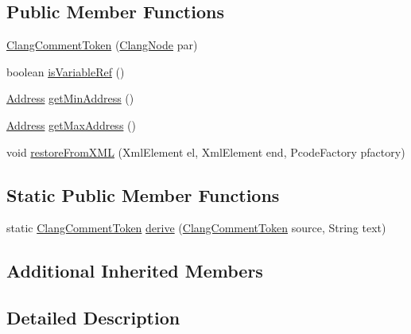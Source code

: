 \subsection*{Public Member Functions}
\begin{DoxyCompactItemize}
\item 
\mbox{\hyperlink{classghidra_1_1app_1_1decompiler_1_1_clang_comment_token_a1cb6ab510d9ce9249f82ac0c9279a7d6}{Clang\+Comment\+Token}} (\mbox{\hyperlink{interfaceghidra_1_1app_1_1decompiler_1_1_clang_node}{Clang\+Node}} par)
\item 
boolean \mbox{\hyperlink{classghidra_1_1app_1_1decompiler_1_1_clang_comment_token_accf25b09504782348ff3a62f3633c89b}{is\+Variable\+Ref}} ()
\item 
\mbox{\hyperlink{class_address}{Address}} \mbox{\hyperlink{classghidra_1_1app_1_1decompiler_1_1_clang_comment_token_a37ada2eb4a2e4a987ae098096459910a}{get\+Min\+Address}} ()
\item 
\mbox{\hyperlink{class_address}{Address}} \mbox{\hyperlink{classghidra_1_1app_1_1decompiler_1_1_clang_comment_token_a53786dc2d9ec711ddb5c3c4864a651be}{get\+Max\+Address}} ()
\item 
void \mbox{\hyperlink{classghidra_1_1app_1_1decompiler_1_1_clang_comment_token_a4c624187ab1de19ccc2aaf7e9f659d99}{restore\+From\+X\+ML}} (Xml\+Element el, Xml\+Element end, Pcode\+Factory pfactory)
\end{DoxyCompactItemize}
\subsection*{Static Public Member Functions}
\begin{DoxyCompactItemize}
\item 
static \mbox{\hyperlink{classghidra_1_1app_1_1decompiler_1_1_clang_comment_token}{Clang\+Comment\+Token}} \mbox{\hyperlink{classghidra_1_1app_1_1decompiler_1_1_clang_comment_token_a8edaa235b8dac1e254bb1aa4bc0ef55c}{derive}} (\mbox{\hyperlink{classghidra_1_1app_1_1decompiler_1_1_clang_comment_token}{Clang\+Comment\+Token}} source, String text)
\end{DoxyCompactItemize}
\subsection*{Additional Inherited Members}


\subsection{Detailed Description}


